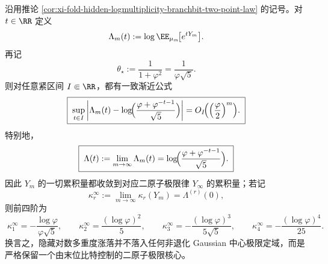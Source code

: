 \begin{theorem}\label{thm:xi-fold-hidden-logmultiplicity-laplace-cumulant-closed}
沿用推论 \ref{cor:xi-fold-hidden-logmultiplicity-branchbit-two-point-law} 的记号。对 \(t\in\RR\) 定义
\[
\Lambda_m(t):=\log \EE_{\mu_m}\!\bigl[e^{tY_m}\bigr].
\]
再记
\[
\theta_\star:=\frac{1}{1+\varphi^2}=\frac{1}{\varphi\sqrt5}.
\]
则对任意紧区间 \(I\Subset\RR\)，都有一致渐近公式
\[
\boxed{\;
\sup_{t\in I}
\left|
\Lambda_m(t)
-\log\!\Bigl(\frac{\varphi+\varphi^{-t-1}}{\sqrt5}\Bigr)
\right|
=
O_I\!\Bigl(\Bigl(\frac{\varphi}{2}\Bigr)^m\Bigr).\;}
\]
特别地，
\[
\boxed{\;
\Lambda(t):=\lim_{m\to\infty}\Lambda_m(t)
=
\log\!\Bigl(\frac{\varphi+\varphi^{-t-1}}{\sqrt5}\Bigr).\;}
\]
因此 \(Y_m\) 的一切累积量都收敛到对应二原子极限律 \(Y_\infty\) 的累积量；若记
\[
\kappa_r^\infty:=\lim_{m\to\infty}\kappa_r(Y_m)=\Lambda^{(r)}(0),
\]
则前四阶为
\[
\boxed{\;
\kappa_1^\infty=-\frac{\log\varphi}{\varphi\sqrt5},\qquad
\kappa_2^\infty=\frac{(\log\varphi)^2}{5},\qquad
\kappa_3^\infty=-\frac{(\log\varphi)^3}{5\sqrt5},\qquad
\kappa_4^\infty=-\frac{(\log\varphi)^4}{25}.\;}
\]
换言之，隐藏对数多重度涨落并不落入任何非退化 Gaussian 中心极限定域，而是严格保留一个由末位比特控制的二原子极限核心。
\end{theorem}
